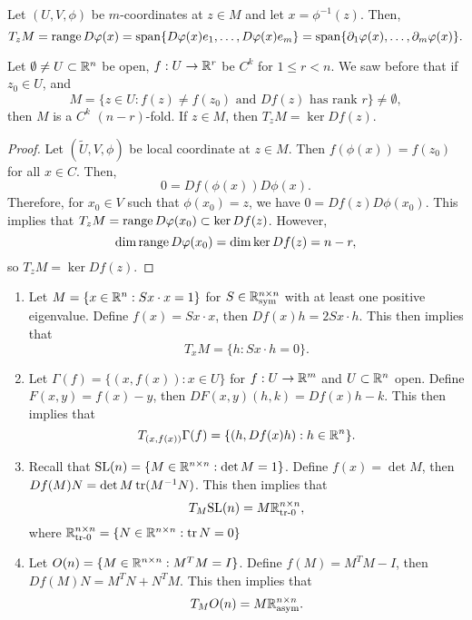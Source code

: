 \documentclass[a4paper]{article}
\begin{document}
\begin{eg}
Let $(U, V, \phi)$ be $m$-coordinates at $z \in M$ and 
let $x = \phi^{-1}(z)$. Then, 
\[
T_z M = \operatorname{range} D\varphi(x) = \operatorname{span} \{D \varphi(x) e_1, \dots, 
D \varphi(x) e_m\} = 
\operatorname{span} \{\partial_1 \varphi(x), \dots, \partial_m \varphi(x)\}.
\]
\end{eg}

\begin{thm}
Let $\emptyset \neq U \subset \mathbb{R}^n$ be open, $f : U \to \mathbb{R}^r$
be $C^k$ for $1 \leq r < n$. We saw before that if $z_0 \in U$,
and 
\[
M = \{z \in U : \text{$f(z) \neq f(z_0)$ and $Df(z)$ 
has rank $r$}\} \neq \emptyset,
\]
then $M$ is a $C^k$ $(n - r)$-fold. If $z \in M$, then  
$T_z M = \ker Df(z)$.
\end{thm}

\begin{proof}
Let $(\tilde{U}, V, \phi)$ be local coordinate at $z \in M$. 
Then $f(\phi(x)) = f(z_0)$ for all $x \in C$. Then, 
\[
0 = Df(\phi(x)) D\phi(x).
\]
Therefore, for $x_0 \in V$ such that $\phi(x_0) = z$, we have 
$0 = Df(z) D\phi(x_0)$. This implies that 
$T_z M = \operatorname{range} D\varphi(x_0) \subset \ker Df(z)$. However, 
\[
\dim \operatorname{range} D\varphi(x_0) = \dim \ker Df(z) = n - r,
\]
so 
$T_z M = \ker Df(z)$.
\end{proof}

\begin{eg}
\begin{enumerate}
\item Let $M = \{x \in \mathbb{R}^n : S x \cdot x = 1\}$ 
for $S \in \mathbb{R}^{n \times n}_{\text{sym}}$
with at least one positive eigenvalue. Define
$f(x) = Sx \cdot x$, then 
$Df(x) h = 2 Sx \cdot h$. This then implies that 
\[
T_x M = \{h : Sx \cdot h = 0\}.
\]

\item Let $\Gamma(f) = \{(x, f(x)) : x \in U\}$ for 
$f : U \to \mathbb{R}^m$ and $U \subset \mathbb{R}^n$ open. Define 
$F(x, y) = f(x) - y$, then $DF(x, y) (h, k) = Df(x) h - k$.
This then implies that 
\[
T_{(x, f(x))} \Gamma(f) = \{(h, Df(x) h) : h \in \mathbb{R}^n\}.
\]

\item Recall that $\mathrm{SL}(n) = \{M \in \mathbb{R}^{n \times n} : 
\det M = 1\}$. Define 
$f(x) = \det M$, then $Df(M) N = \det M \operatorname{tr} (M^{-1} N)$.
This then implies that 
\[
T_M \mathrm{SL}(n) = M \mathbb{R}^{n \times n}_{\text{tr-$0$}},
\]
where $\mathbb{R}^{n \times n}_{\text{tr-$0$}} = \{N \in \mathbb{R}^{n \times n}: 
\operatorname{tr} N = 0\}$

\item Let $O(n) = \{M \in \mathbb{R}^{n \times n} : M^T M = I\}$. 
Define $f(M) = M^T M - I$, then $Df(M) N = M^T N + N^T M$.
This then implies that 
\[
T_M O(n) = M \mathbb{R}^{n \times n}_{\text{asym}}.
\]
\end{enumerate}
\end{eg}
\end{document}
